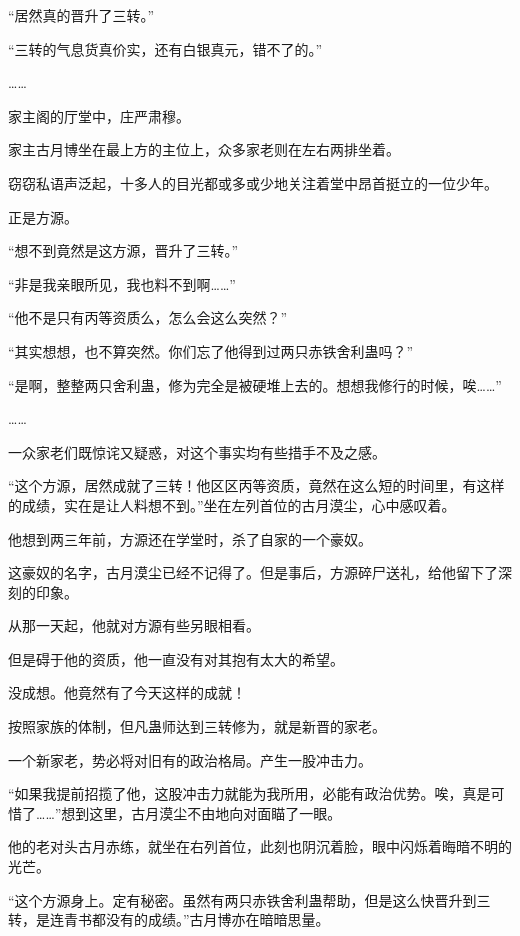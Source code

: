 
\begin{this_body}

“居然真的晋升了三转。”

“三转的气息货真价实，还有白银真元，错不了的。”

……

家主阁的厅堂中，庄严肃穆。

家主古月博坐在最上方的主位上，众多家老则在左右两排坐着。

窃窃私语声泛起，十多人的目光都或多或少地关注着堂中昂首挺立的一位少年。

正是方源。

“想不到竟然是这方源，晋升了三转。”

“非是我亲眼所见，我也料不到啊……”

“他不是只有丙等资质么，怎么会这么突然？”

“其实想想，也不算突然。你们忘了他得到过两只赤铁舍利蛊吗？”

“是啊，整整两只舍利蛊，修为完全是被硬堆上去的。想想我修行的时候，唉……”

……

一众家老们既惊诧又疑惑，对这个事实均有些措手不及之感。

“这个方源，居然成就了三转！他区区丙等资质，竟然在这么短的时间里，有这样的成绩，实在是让人料想不到。”坐在左列首位的古月漠尘，心中感叹着。

他想到两三年前，方源还在学堂时，杀了自家的一个豪奴。

这豪奴的名字，古月漠尘已经不记得了。但是事后，方源碎尸送礼，给他留下了深刻的印象。

从那一天起，他就对方源有些另眼相看。

但是碍于他的资质，他一直没有对其抱有太大的希望。

没成想。他竟然有了今天这样的成就！

按照家族的体制，但凡蛊师达到三转修为，就是新晋的家老。

一个新家老，势必将对旧有的政治格局。产生一股冲击力。

“如果我提前招揽了他，这股冲击力就能为我所用，必能有政治优势。唉，真是可惜了……”想到这里，古月漠尘不由地向对面瞄了一眼。

他的老对头古月赤练，就坐在右列首位，此刻也阴沉着脸，眼中闪烁着晦暗不明的光芒。

“这个方源身上。定有秘密。虽然有两只赤铁舍利蛊帮助，但是这么快晋升到三转，是连青书都没有的成绩。”古月博亦在暗暗思量。


\end{this_body}
